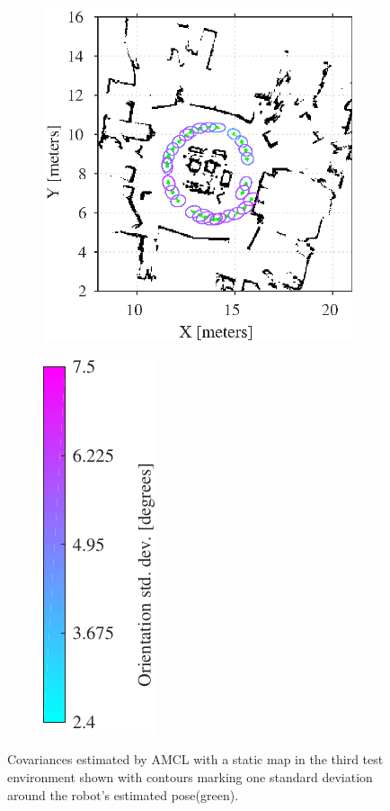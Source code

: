 \begin{figure}[htbp]
	\centering
	\begin{subfigure}[t]{0.55\textwidth}
		\includegraphics[scale=1.0]{chapters/evaluation/figures/localization_static_map3}		
	\end{subfigure}
	\begin{subfigure}[t]{0.2\textwidth}
		\includegraphics[scale=1.0]{chapters/evaluation/figures/localization_std_color_bar-crop}
	\end{subfigure}
	\label{fig:amcl_covariance_static3}
	\caption{Covariances estimated by AMCL with a static map in the third test environment shown with contours marking one standard deviation around the robot's estimated pose(green).}
\end{figure}

